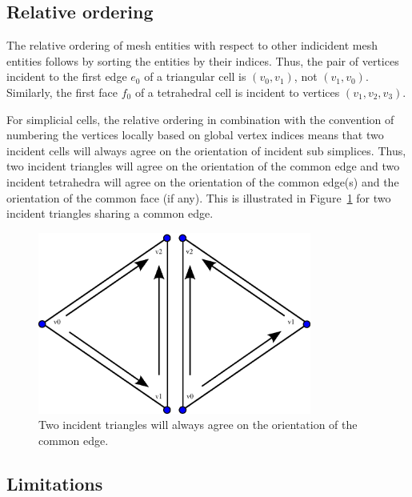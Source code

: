 \subsection{Relative ordering}

The relative ordering of mesh entities with respect to other
indicident mesh entities follows by sorting the entities by their
indices. Thus, the pair of vertices incident to the first edge $e_0$
of a triangular cell is $(v_0, v_1)$, not $(v_1, v_0)$. Similarly, the
first face $f_0$ of a tetrahedral cell is incident to vertices $(v_1,
v_2, v_3)$.

For simplicial cells, the relative ordering in combination with the
convention of numbering the vertices locally based on global vertex
indices means that two incident cells will always agree on the
orientation of incident sub simplices. Thus, two incident triangles
will agree on the orientation of the common edge and two incident
tetrahedra will agree on the orientation of the common edge(s) and the
orientation of the common face (if any). This is illustrated in
Figure~\ref{fig:orientation_example_triangles} for two incident triangles sharing a
common edge.

\begin{figure}[htbp]
  \begin{center}
    \includegraphics[width=9cm]{eps/orientation_example_triangles.eps}
    \caption{Two incident triangles will always agree on the
      orientation of the common edge.}
    \label{fig:orientation_example_triangles}
  \end{center}
\end{figure}

\subsection{Limitations}
 
